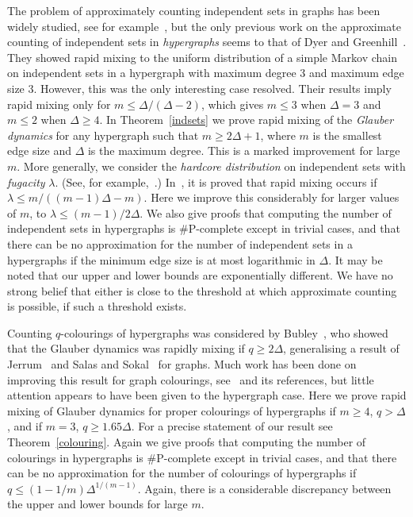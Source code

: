 \documentclass[11pt]{article}
\theoremstyle{definition}
\theoremstyle{remark}
\begin{document}
The problem of approximately counting independent sets in graphs has been
widely studied, see for example~\cite{DFJ99,DG00a,LV99,M01,V01}, but the
only previous work on the approximate counting of independent sets in
\emph{hypergraphs} seems to that of Dyer and Greenhill~\cite{DG00a}. They
showed rapid mixing to the uniform distribution of a simple Markov chain on
independent sets in a hypergraph with maximum degree 3 and maximum edge
size 3. However, this was the only interesting case resolved. Their results
imply rapid mixing only for $m\leq \Delta/(\Delta-2)$, which gives $m\leq
3$ when $\Delta=3$ and $m\leq 2$ when $\Delta\geq 4$. In
Theorem~\ref{indsets} we prove rapid mixing of the \emph{Glauber dynamics}
for any hypergraph such that $m\geq 2\Delta+1$, where $m$ is the smallest
edge size and $\Delta$ is the maximum degree. This is a marked improvement
for large $m$. More generally, we consider the \emph{hardcore distribution}
on independent sets with \emph{fugacity} $\lambda$. (See, for
example,~\cite{DG00a,LV99,V01}.) In~\cite{DG00a}, it is proved that rapid
mixing occurs if $\lambda\leq m/((m-1)\Delta-m)$. Here we improve this
considerably for larger values of $m$, to $\lambda\leq (m-1)/2\Delta$. We
also give proofs that computing the number of independent sets in
hypergraphs is \#P-complete except in trivial cases, and that there can be
no approximation for the number of independent sets in a hypergraphs if the
minimum edge size is at most logarithmic in $\Delta$. It may be noted that
our upper and lower bounds are exponentially different. We have no strong
belief that either is close to the threshold at which approximate counting
is possible, if such a threshold exists.

Counting $q$-colourings of hypergraphs was considered by Bubley~\cite{B01},
who showed that the Glauber dynamics was rapidly mixing if $q\geq 2\Delta$,
generalising a result of Jerrum~\cite{J95} and Salas and Sokal~\cite{SS97}
for graphs.  Much work has been done on improving this result for graph
colourings, see~\cite{DFHV04} and its references, but little attention
appears to have been given to the hypergraph case. Here we prove rapid
mixing of Glauber dynamics for proper colourings of hypergraphs if  $m\geq
4$, $q>\Delta$, and if $m=3$, $q\geq1.65\Delta$. For a precise statement of
our result see Theorem~\ref{colouring}. Again we give proofs that computing
the number of colourings in hypergraphs is \#P-complete except in trivial
cases, and that there can be no approximation for the number of colourings
of hypergraphs if $q\leq (1-1/m)\Delta^{1/(m-1)}$. Again, there is a
considerable discrepancy between the upper and lower bounds for large $m$.
\end{document}
